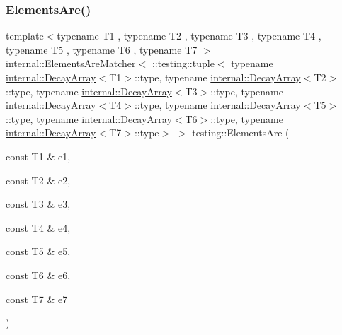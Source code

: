 \subsubsection{\texorpdfstring{ElementsAre()}{ElementsAre()}\hspace{0.1cm}{\footnotesize\ttfamily [8/11]}}
{\footnotesize\ttfamily template$<$typename T1 , typename T2 , typename T3 , typename T4 , typename T5 , typename T6 , typename T7 $>$ \\
internal\+::\+Elements\+Are\+Matcher$<$ \+::testing\+::tuple$<$ typename \mbox{\hyperlink{structtesting_1_1internal_1_1DecayArray}{internal\+::\+Decay\+Array}}$<$T1$>$\+::type, typename \mbox{\hyperlink{structtesting_1_1internal_1_1DecayArray}{internal\+::\+Decay\+Array}}$<$T2$>$\+::type, typename \mbox{\hyperlink{structtesting_1_1internal_1_1DecayArray}{internal\+::\+Decay\+Array}}$<$T3$>$\+::type, typename \mbox{\hyperlink{structtesting_1_1internal_1_1DecayArray}{internal\+::\+Decay\+Array}}$<$T4$>$\+::type, typename \mbox{\hyperlink{structtesting_1_1internal_1_1DecayArray}{internal\+::\+Decay\+Array}}$<$T5$>$\+::type, typename \mbox{\hyperlink{structtesting_1_1internal_1_1DecayArray}{internal\+::\+Decay\+Array}}$<$T6$>$\+::type, typename \mbox{\hyperlink{structtesting_1_1internal_1_1DecayArray}{internal\+::\+Decay\+Array}}$<$T7$>$\+::type$>$ $>$ testing\+::\+Elements\+Are (\begin{DoxyParamCaption}\item[{const T1 \&}]{e1,  }\item[{const T2 \&}]{e2,  }\item[{const T3 \&}]{e3,  }\item[{const T4 \&}]{e4,  }\item[{const T5 \&}]{e5,  }\item[{const T6 \&}]{e6,  }\item[{const T7 \&}]{e7 }\end{DoxyParamCaption})\hspace{0.3cm}{\ttfamily [inline]}}

\mbox{\label{namespacetesting_a8d498031827c1d089dc84f5f14b7df12}} 
